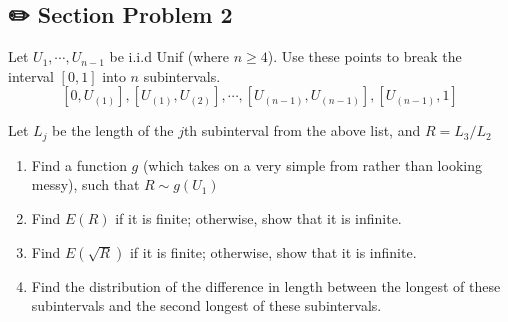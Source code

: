 \documentclass[
  letterpaper,
  DIV=11,
  numbers=noendperiod]{scrreprt}
\theoremstyle{definition}
\theoremstyle{plain}
\theoremstyle{remark}
\begin{document}
\hypertarget{section-problem-2-2}{%
\subsection*{✏️ Section Problem 2}\label{section-problem-2-2}}

Let \(U_{1}, \cdots, U_{n-1}\) be i.i.d Unif (where \(n \geq 4\)). Use
these points to break the interval \([0,1]\) into \(n\) subintervals.
\[[0, U_{(1)}], [U_{(1)}, U_{(2)}], \cdots, [U_{(n-1)}, U_{(n-1)}], [U_{(n-1)}, 1]\]

Let \(L_j\) be the length of the \(j\)th subinterval from the above
list, and \(R=L_3/L_2\)

\begin{enumerate}
\def\labelenumi{(\alph{enumi})}
\item
  Find a function \(g\) (which takes on a very simple from rather than
  looking messy), such that \(R\sim g(U_1)\)
\item
  Find \(E(R)\) if it is finite; otherwise, show that it is infinite.
\item
  Find \(E(\sqrt{R})\) if it is finite; otherwise, show that it is
  infinite.
\item
  Find the distribution of the difference in length between the longest
  of these subintervals and the second longest of these subintervals.
\end{enumerate}
\end{document}
